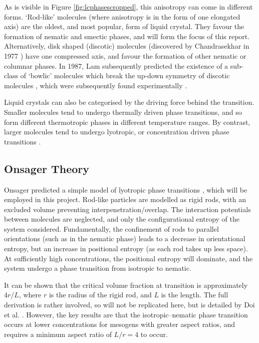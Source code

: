 \documentclass[11pt, a4paper]{article} %
\begin{document}
As is visible in Figure \ref{fig:lcphasescropped}, this anisotropy can come in different forms. `Rod-like' molecules (where anisotropy is in the form of one elongated axis) are the oldest, and most popular, form of liquid crystal. They favour the formation of nematic and smectic phases, and will form the focus of this report. Alternatively, disk shaped (discotic) molecules (discovered by Chandrasekhar in 1977 \cite{Chandrasekhar1977}) have one compressed axis, and favour the formation of other nematic or columnar phases. In 1987, Lam subsequently predicted the existence of a sub-class of `bowlic' molecules which break the up-down symmetry of discotic molecules \cite{LinLei1988}, which were subsequently found experimentally \cite{Zimmermann1985, Malthete1985}.

Liquid crystals can also be categorised by the driving force behind the transition. Smaller molecules tend to undergo thermally driven phase transitions, and so form different thermotropic phases in different temperature ranges. By contrast, larger molecules tend to undergo lyotropic, or concentration driven phase transitions \cite{DeGennes1993}.

\subsection{Onsager Theory} \label{Onsager}
Onsager predicted a simple model of lyotropic phase transitions \cite{Onsager1949}, which will be employed in this project. Rod-like particles are modelled as rigid rods, with an excluded volume preventing interpenetration/overlap. The interaction potentials between molecules are neglected, and only the configurational entropy of the system considered. Fundamentally, the confinement of rods to parallel orientations (such as in the nematic phase) leads to a decrease in orientational entropy, but an increase in positional entropy (as each rod takes up less space). At sufficiently high concentrations, the positional entropy will dominate, and the system undergo a phase transition from isotropic to nematic. 

It can be shown that the critical volume fraction at transition is approximately $4r/L$, where $r$ is the radius of the rigid rod, and $L$ is the length. The full derivation is rather involved, so will not be replicated here, but is detailed by Doi et al. \cite{Doi1988}. However, the key results are that the isotropic--nematic phase transition occurs at lower concentrations for mesogens with greater aspect ratios, and requires a minimum aspect ratio of $L/r = 4$ to occur.
\end{document}
